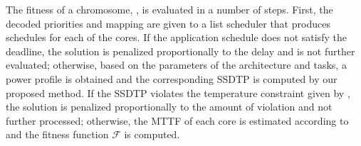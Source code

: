 The fitness of a chromosome, , is evaluated in a number
of steps. First, the decoded priorities and mapping are given to a list
scheduler that produces schedules for each of the cores. If the application
schedule does not satisfy the deadline, the solution is penalized proportionally
to the delay and is not further evaluated; otherwise, based on the parameters of
the architecture and tasks, a power profile is obtained and the corresponding
SSDTP is computed by our proposed method. If the SSDTP violates the temperature
constraint given by , the solution is penalized proportionally to
the amount of violation and not further processed; otherwise, the MTTF of each
core is estimated according to  and the fitness function
$\mathcal{F}$ is computed.
